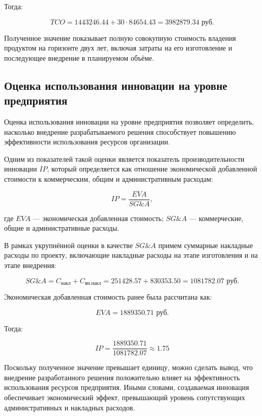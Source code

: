 Тогда:

\begin{equation}
TCO = 1443246.44 + 30 \cdot 84654.43 = 3982879.34 \text{ руб.}
\end{equation}

Полученное значение показывает полную совокупную стоимость владения
продуктом на горизонте двух лет, включая затраты на его изготовление и
последующее внедрение в планируемом объёме.

\subsection*{Оценка использования инновации на уровне предприятия}

Оценка использования инновации на уровне предприятия позволяет
определить, насколько внедрение разрабатываемого решения способствует
повышению эффективности использования ресурсов организации.

Одним из показателей такой оценки является показатель
производительности инновации $IP$, который определяется как отношение
экономической добавленной стоимости к коммерческим, общим и
административным расходам:

\begin{equation}
IP = \frac{EVA}{SG\&A},
\end{equation}

где $EVA$ --- экономическая добавленная стоимость;
$SG\&A$ --- коммерческие, общие и административные расходы.

В рамках укрупнённой оценки в качестве $SG\&A$ примем суммарные
накладные расходы по проекту, включающие накладные расходы на этапе
изготовления и на этапе внедрения:

\[
SG\&A = C_{\text{накл}} + C_{\text{вн.накл}} =
251428.57 + 830353.50 = 1081782.07 \text{ руб.}
\]

Экономическая добавленная стоимость ранее была рассчитана как:

\[
EVA = 1889350.71 \text{ руб.}
\]

Тогда:

\begin{equation}
IP = \frac{1889350.71}{1081782.07} \approx 1.75
\end{equation}

Поскольку полученное значение превышает единицу, можно сделать вывод,
что внедрение разработанного решения положительно влияет на
эффективность использования ресурсов предприятия. Иными словами,
создаваемая инновация обеспечивает экономический эффект, превышающий
уровень сопутствующих административных и накладных расходов.

